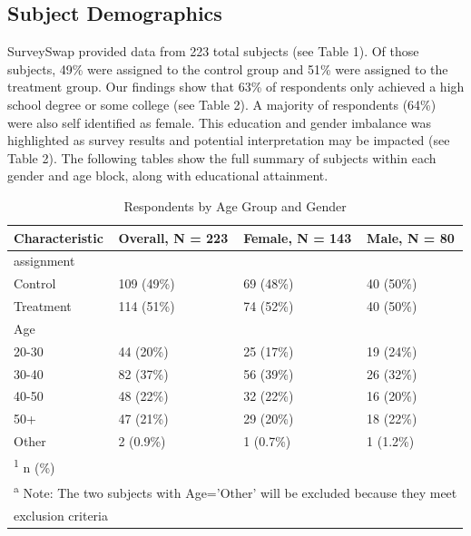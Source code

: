 \documentclass[
]{article}
\begin{document}
\hypertarget{subject-demographics}{%
\subsection{Subject Demographics}\label{subject-demographics}}

SurveySwap provided data from 223 total subjects (see Table 1). Of those
subjects, 49\% were assigned to the control group and 51\% were assigned
to the treatment group. Our findings show that 63\% of respondents only
achieved a high school degree or some college (see Table 2). A majority
of respondents (64\%) were also self identified as female. This
education and gender imbalance was highlighted as survey results and
potential interpretation may be impacted (see Table 2). The following
tables show the full summary of subjects within each gender and age
block, along with educational attainment.

\begin{table}[H]

\caption{\label{tab:table1_2}Respondents by Age Group and Gender}
\centering
\begin{tabular}[t]{l|l|l|l}
\hline
Characteristic & Overall, N = 223 & Female, N = 143 & Male, N = 80\\
\hline
assignment &  &  & \\
\hline
\hspace{1em}Control & 109 (49\%) & 69 (48\%) & 40 (50\%)\\
\hline
\hspace{1em}Treatment & 114 (51\%) & 74 (52\%) & 40 (50\%)\\
\hline
Age &  &  & \\
\hline
\hspace{1em}20-30 & 44 (20\%) & 25 (17\%) & 19 (24\%)\\
\hline
\hspace{1em}30-40 & 82 (37\%) & 56 (39\%) & 26 (32\%)\\
\hline
\hspace{1em}40-50 & 48 (22\%) & 32 (22\%) & 16 (20\%)\\
\hline
\hspace{1em}50+ & 47 (21\%) & 29 (20\%) & 18 (22\%)\\
\hline
\hspace{1em}Other & 2 (0.9\%) & 1 (0.7\%) & 1 (1.2\%)\\
\hline
\multicolumn{4}{l}{\rule{0pt}{1em}\textsuperscript{1} n (\%)}\\
\multicolumn{4}{l}{\textsuperscript{a} Note: The two subjects with Age='Other' will be excluded because they meet}\\
\multicolumn{4}{l}{exclusion criteria}\\
\end{tabular}
\end{table}
\end{document}
